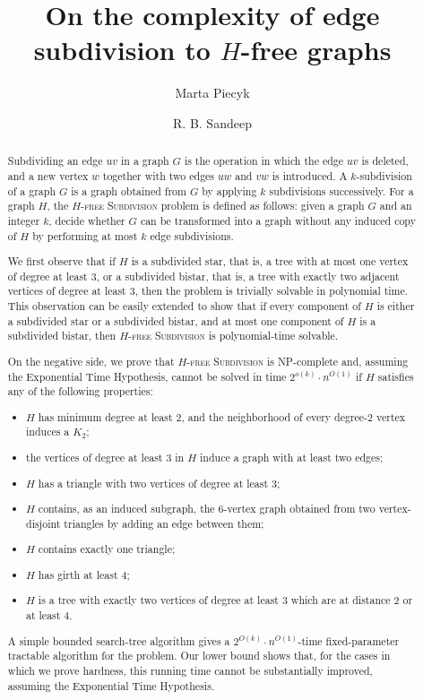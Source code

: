 \documentclass[a4paper,UKenglish,cleveref, autoref, thm-restate]{lipics-v2021}
\title{On the complexity of edge subdivision to $H$-free graphs} %
\author{Marta Piecyk}{CISPA Helmholtz Center for Information Security, Germany}{marta.piecyk@cispa.de}{0000-0001-9162-8300}{}
\author{R. B. Sandeep}{Indian Institute of Technology Dharwad, India}{sandeeprb@iitdh.ac.in}{0000-0003-4383-1819}{Supported by Anusandhan National Research Foundation (India) grant MTR/2022/000692}%
\begin{document}
\maketitle

\begin{abstract}
Subdividing an edge $uv$ in a graph $G$ is the operation in which the edge $uv$ is deleted, and a new vertex $w$ together with two edges $uw$ and $vw$ is introduced. A $k$-subdivision of a graph $G$ is a graph obtained from $G$ by applying $k$ subdivisions successively. For a graph $H$, the \textsc{$H$-free Subdivision} problem is defined as follows: given a graph $G$ and an integer $k$, decide whether $G$ can be transformed into a graph without any induced copy of $H$ by performing at most $k$ edge subdivisions.

We first observe that if $H$ is a subdivided star, that is, a tree with at most one vertex of degree at least $3$, or a subdivided bistar, that is, a tree with exactly two adjacent vertices of degree at least $3$, then the problem is trivially solvable in polynomial time. This observation can be easily extended to show that if every component of $H$ is either a subdivided star or a subdivided bistar, and at most one component of $H$ is a subdivided bistar, then \textsc{$H$-free Subdivision} is polynomial-time solvable.

On the negative side, we prove that \textsc{$H$-free Subdivision} is NP-complete and, assuming the Exponential Time Hypothesis, cannot be solved in time $2^{o(k)}\cdot n^{O(1)}$ if $H$ satisfies any of the following properties:
\begin{itemize}
    \item $H$ has minimum degree at least $2$, and the neighborhood of every degree-$2$ vertex induces a $K_2$;
    \item the vertices of degree at least $3$ in $H$ induce a graph with at least two edges;
    \item $H$ has a triangle with two vertices of degree at least $3$;
    \item $H$ contains, as an induced subgraph, the $6$-vertex graph obtained from two vertex-disjoint triangles by adding an edge between them;
    \item $H$ contains exactly one triangle;
    \item $H$ has girth at least $4$;
    \item $H$ is a tree with exactly two vertices of degree at least $3$ which are at distance $2$ or at least $4$.
\end{itemize}
A simple bounded search-tree algorithm gives a
$2^{O(k)}\cdot n^{O(1)}$-time fixed-parameter tractable algorithm for the problem.
Our lower bound shows that, for the cases in which we prove hardness, this running time cannot be substantially improved, assuming the Exponential Time Hypothesis.

\end{abstract}
\end{document}
